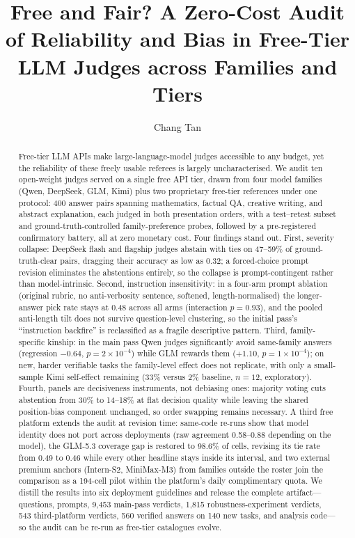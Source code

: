 \documentclass[review,12pt]{elsarticle}
\begin{document}
\begin{frontmatter}

\title{Free and Fair? A Zero-Cost Audit of Reliability and Bias
       in Free-Tier LLM Judges across Families and Tiers}

\author[dlut]{Chang Tan}
\address[dlut]{Dalian University of Technology, Dalian 116024, China}

\begin{abstract}
Free-tier LLM APIs make large-language-model judges accessible to any
budget, yet the reliability of these freely usable referees is largely
uncharacterised. We audit ten open-weight judges served on a single free
API tier, drawn from four model families
(Qwen, DeepSeek, GLM, Kimi) plus two proprietary free-tier references
under one protocol: 400 answer pairs spanning mathematics, factual QA,
creative writing, and abstract explanation, each judged in both
presentation orders, with a test--retest subset and ground-truth-controlled
family-preference probes, followed by a pre-registered confirmatory battery,
all at zero monetary cost. Four findings stand out. First,
severity collapse: DeepSeek flash and flagship judges abstain
with ties on 47--59\% of ground-truth-clear pairs, dragging their accuracy
as low as 0.32; a forced-choice prompt revision eliminates the abstentions
entirely, so the collapse is prompt-contingent rather than model-intrinsic.
Second, instruction insensitivity: in a four-arm prompt ablation (original
rubric, no anti-verbosity sentence, softened, length-normalised) the
longer-answer pick rate stays at 0.48 across all arms (interaction
$p=0.93$), and the pooled anti-length tilt does not survive question-level
clustering, so the initial pass's ``instruction backfire'' is reclassified
as a fragile descriptive pattern. Third, family-specific kinship: in the
main pass Qwen judges significantly avoid same-family answers (regression
$-0.64$, $p=2\times10^{-4}$) while GLM rewards them ($+1.10$,
$p=1\times10^{-4}$); on new, harder verifiable tasks the family-level
effect does not replicate, with only a small-sample Kimi self-effect
remaining (33\% versus 2\% baseline, $n=12$, exploratory). Fourth, panels
are decisiveness instruments, not debiasing ones: majority voting cuts
abstention from 30\% to 14--18\% at flat decision quality while leaving the
shared position-bias component unchanged, so order swapping remains
necessary. A third free platform extends the audit at revision time: same-code
re-runs show that model identity does not port across deployments (raw
agreement 0.58--0.88 depending on the model), the GLM-5.3 coverage gap is
restored to 98.6\% of cells, revising its tie rate from 0.49 to 0.46
while every other headline stays inside its interval, and two external
premium anchors (Intern-S2, MiniMax-M3) from families outside the roster
join the comparison as a 194-cell pilot within the platform's daily
complimentary quota. We distill the results into six deployment
guidelines and release the complete artifact---questions, prompts, 9,453
main-pass verdicts, 1,815 robustness-experiment verdicts, 543
third-platform verdicts, 560 verified answers on 140 new tasks, and
analysis code---so the audit can be re-run as free-tier catalogues
evolve.
\end{abstract}


\end{frontmatter}
\end{document}
